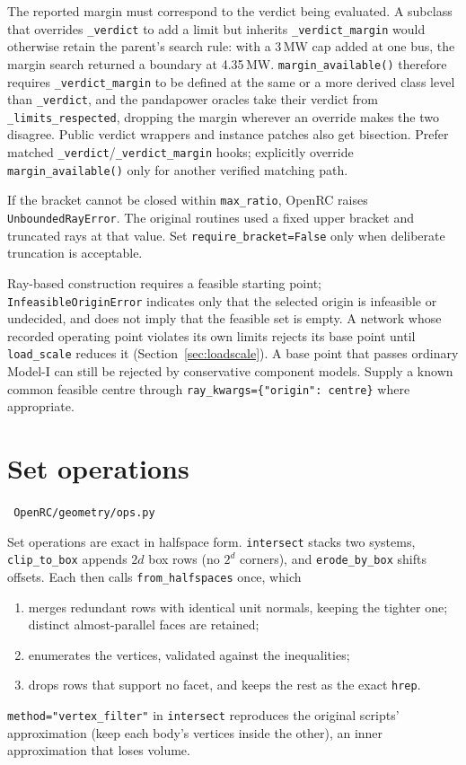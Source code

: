 \documentclass[11pt,a4paper]{report}
\newcommand{\trap}[1]{\begin{warnbox}#1\end{warnbox}}
\newcommand{\code}[1]{\texttt{\small #1}}
\newcommand{\file}[1]{\texttt{\small\color{nbgrey} #1}}
\begin{document}
\trap{The reported margin must correspond to the verdict being evaluated.
A subclass that overrides \code{\_verdict} to add a limit but inherits
\code{\_verdict\_margin} would otherwise retain the parent's search rule: with
a 3\,MW cap added at one bus, the margin search returned a boundary at
4.35\,MW. \code{margin\_available()} therefore requires \code{\_verdict\_margin}
to be defined at the same or a more derived class level than
\code{\_verdict}, and the pandapower oracles take their verdict from
\code{\_limits\_respected}, dropping the margin wherever an override makes the
two disagree. Public verdict wrappers and instance patches also get bisection.
Prefer matched \code{\_verdict}/\code{\_verdict\_margin} hooks; explicitly
override \code{margin\_available()} only for another verified matching path.}

\trap{If the bracket cannot be closed within \code{max\_ratio}, OpenRC raises
\code{UnboundedRayError}. The original routines used a fixed upper bracket
and truncated rays at that value. Set
\code{require\_bracket=False} only when deliberate truncation is acceptable.}

Ray-based construction requires a feasible starting point;
\code{InfeasibleOriginError} indicates only that the selected origin is
infeasible or undecided, and does not imply that the feasible set is empty. A network whose recorded operating point violates
its own limits rejects its base point until \code{load\_scale} reduces it
(Section~\ref{sec:loadscale}). A base point that passes ordinary Model-I can
still be rejected by conservative component models. Supply a known common feasible centre through
\code{ray\_kwargs=\{"origin": centre\}} where appropriate.

\section{Set operations}
\label{sec:setops}

\file{OpenRC/geometry/ops.py}

Set operations are exact in halfspace form. \code{intersect} stacks two
systems, \code{clip\_to\_box} appends $2d$ box rows (no $2^d$ corners), and
\code{erode\_by\_box} shifts offsets. Each then calls \code{from\_halfspaces}
once, which
\begin{enumerate}
\item merges redundant rows with identical unit normals, keeping the tighter
  one; distinct almost-parallel faces are retained;
\item enumerates the vertices, validated against the inequalities;
\item drops rows that support no facet, and keeps the rest as the exact
  \code{hrep}.
\end{enumerate}
\code{method="vertex\_filter"} in \code{intersect} reproduces the original
scripts' approximation (keep each body's vertices inside the other), an inner
approximation that loses volume.
\end{document}
